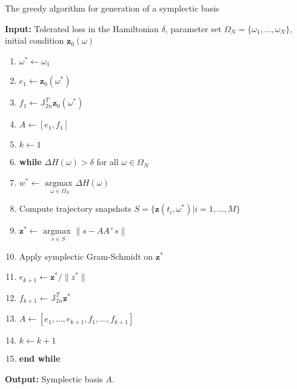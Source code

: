\begin{algorithm} 
\caption{The greedy algorithm for generation of a symplectic basis} \label{alg:SyMo:3}
{\bf Input:} Tolerated loss in the Hamiltonian $\delta$, parameter set $\Omega_N = \{\omega_1,\dots,\omega_N\}$, initial condition $\mathbf z_0(\omega)$
\begin{enumerate}
\item $\omega^* \leftarrow \omega_1$
\item $e_1 \leftarrow \mathbf z_0(\omega^*)$
\item $f_1 \leftarrow \mathbb J^T_{2n} \mathbf z_0(\omega^*)$
\item $A \leftarrow [e_1,f_1]$
\item $k \leftarrow 1$
\item \textbf{while} $\Delta H(\omega) > \delta$ for all $\omega \in \Omega_N$
\item \hspace{0.5cm} $w^* \leftarrow$ $\underset{\omega\in \Omega_N}{\text{argmax }}\Delta H(\omega)$
\item \hspace{0.5cm} Compute trajectory snapshots $S=\{ \mathbf z(t_i,\omega^*) | i = 1,\dots,M \}$
\item \hspace{0.5cm} $\mathbf z^* \leftarrow$ $\underset{s\in S}{\text{argmax }} \| s - AA^+s \|$
\item \hspace{0.5cm} Apply symplectic Gram-Schmidt on $\mathbf z^*$
\item \hspace{0.5cm} $e_{k+1} \leftarrow \mathbf z^*/ \| z^*\|$
\item \hspace{0.5cm}$f_{k+1} \leftarrow \mathbb J^T_{2n} \mathbf z^*$
\item \hspace{0.5cm} $A \leftarrow [e_1,\dots ,e_{k+1} , f_1,\dots,f_{k+1}]$
\item \hspace{0.5cm} $k \leftarrow k+1$
\item \textbf{end while}
\end{enumerate}
\vspace{0.5cm}
{\bf Output:} Symplectic basis $A$.
\end{algorithm}

